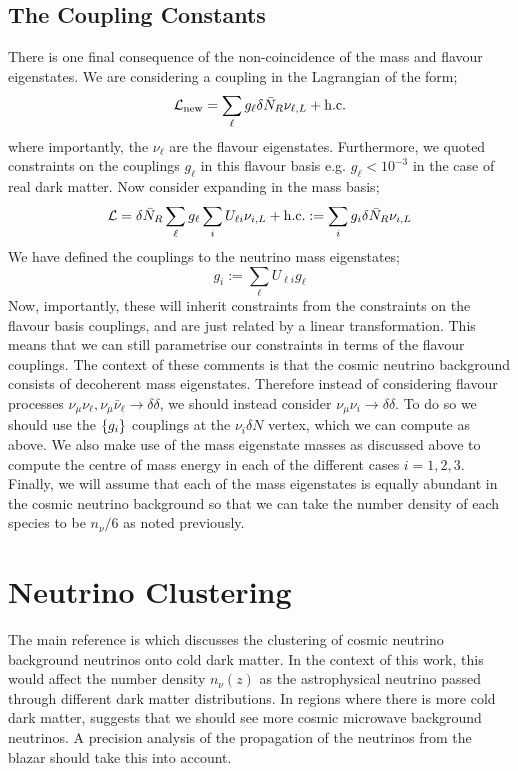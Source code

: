 \documentclass[10pt]{article}
\begin{document}
\subsection{The Coupling Constants}
There is one final consequence of the non-coincidence of the mass and flavour eigenstates. We are considering a coupling in the Lagrangian of the form;
\begin{equation}
  \mathcal{L}_{\textrm{new}} = \sum_{\ell}{g_\ell \delta \bar{N}_R \nu_{\ell, L} + \textrm{h.c.}}
\end{equation}
where importantly, the $\nu_{\ell}$ are the flavour eigenstates. Furthermore, we quoted constraints on the couplings $g_\ell$ in this flavour basis e.g. $g_{\ell} < 10^{-3}$ in the case of real dark matter. Now consider expanding in the mass basis;
\begin{equation}
  \mathcal{L} = \delta \bar{N}_R \sum_{\ell}{g_\ell \sum_{i}{U_{\ell i}\nu_{i, L}}} + \textrm{h.c.} := \sum_i{g_i \delta \bar{N}_R \nu_{i, L}}
\end{equation}
We have defined the couplings to the neutrino mass eigenstates;
\begin{equation}
  g_i := \sum_{\ell}{U_{\ell i}g_{\ell}}
\end{equation}
Now, importantly, these will inherit constraints from the constraints on the flavour basis couplings, and are just related by a linear transformation. This means that we can still parametrise our constraints in terms of the flavour couplings. The context of these comments is that the cosmic neutrino background consists of decoherent mass eigenstates. Therefore instead of considering flavour processes $\nu_\mu \nu_\ell, \nu_\mu \bar{\nu}_\ell \rightarrow \delta\delta$, we should instead consider $\nu_\mu \nu_i \rightarrow \delta \delta$. To do so we should use the $\left\{g_i\right\}$ couplings at the $\nu_i \delta N$ vertex, which we can compute as above. We also make use of the mass eigenstate masses as discussed above to compute the centre of mass energy in each of the different cases $i = 1,2,3$. Finally, we will assume that each of the mass eigenstates is equally abundant in the cosmic neutrino background so that we can take the number density of each species to be $n_\nu/6$ as noted previously.
\section{Neutrino Clustering}
The main reference is \cite{Ringwald2004} which discusses the clustering of cosmic neutrino background neutrinos onto cold dark matter. In the context of this work, this would affect the number density $n_\nu(z)$ as the astrophysical neutrino passed through different dark matter distributions. In regions where there is more cold dark matter, \cite{Ringwald2004} suggests that we should see more cosmic microwave background neutrinos. A precision analysis of the propagation of the neutrinos from the blazar should take this into account.
\end{document}
